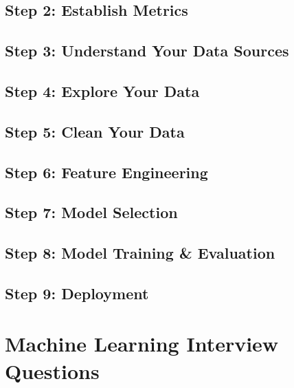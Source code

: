 \documentclass[
]{book}
\begin{document}
\hypertarget{step-2-establish-metrics}{%
\subsection{Step 2: Establish Metrics}\label{step-2-establish-metrics}}

\hypertarget{step-3-understand-your-data-sources}{%
\subsection{Step 3: Understand Your Data Sources}\label{step-3-understand-your-data-sources}}

\hypertarget{step-4-explore-your-data}{%
\subsection{Step 4: Explore Your Data}\label{step-4-explore-your-data}}

\hypertarget{step-5-clean-your-data}{%
\subsection{Step 5: Clean Your Data}\label{step-5-clean-your-data}}

\hypertarget{step-6-feature-engineering}{%
\subsection{Step 6: Feature Engineering}\label{step-6-feature-engineering}}

\hypertarget{step-7-model-selection}{%
\subsection{Step 7: Model Selection}\label{step-7-model-selection}}

\hypertarget{step-8-model-training-evaluation}{%
\subsection{Step 8: Model Training \& Evaluation}\label{step-8-model-training-evaluation}}

\hypertarget{step-9-deployment}{%
\subsection{Step 9: Deployment}\label{step-9-deployment}}

\hypertarget{machine-learning-interview-questions}{%
\section{Machine Learning Interview Questions}\label{machine-learning-interview-questions}}
\end{document}
